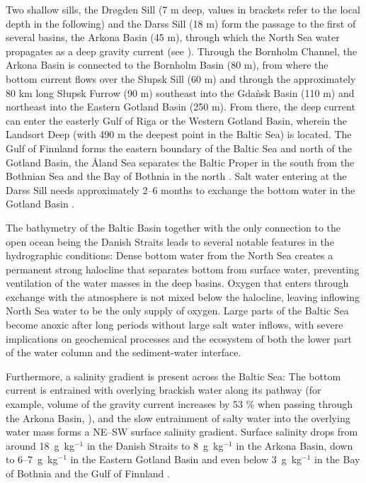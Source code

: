 Two shallow sills, the Dr\o gden Sill (7 m deep, values in brackets refer to the 
local depth in the following) and the Darss Sill (18 m) form the passage to the 
first of several basins, the Arkona Basin (45 m), 
through which the North Sea water propagates as a deep gravity current 
(see ). Through 
the Bornholm Channel, the Arkona Basin is connected to the Bornholm Basin (80 
m), from where the bottom current flows over the S\l upsk Sill (60 m) and 
through the approximately 80 km long S\l upsk Furrow (90 m) southeast into the 
Gda\`{n}sk Basin (110 m) and northeast into the Eastern Gotland Basin (250 m). 
From there, the deep current can enter the easterly Gulf of Riga or the Western 
Gotland Basin, wherein the Landsort Deep (with 490 m the deepest point in the 
Baltic Sea) is located. The Gulf of Finnland forms the eastern boundary of the 
Baltic Sea and north of the Gotland Basin, the \r{A}land Sea separates the 
Baltic Proper in the south from the Bothnian Sea and the Bay of Bothnia in the 
north \citep[][]{reissmann2009}. Salt water entering at the Darss Sill needs 
approximately 2--6 months to exchange the bottom water in the Gotland Basin 
\citep[][]{balticsea}.

The bathymetry of the Baltic Basin together with the only connection to the 
open ocean being the Danish Straits leads to several notable features in the 
hydrographic conditions: Dense bottom water from the North Sea 
creates a permanent strong halocline that separates bottom from surface water, 
preventing ventilation of the water masses in the deep basins. Oxygen that 
enters through exchange with the atmosphere is not mixed below the halocline, 
leaving inflowing North Sea water to be the only supply of oxygen. Large parts 
of the Baltic Sea become anoxic after long periods without large salt 
water inflows, with severe implications on geochemical processes and the 
ecosystem of both the lower part of the water column and the sediment-water 
interface. 

Furthermore, a salinity gradient is present across the Baltic Sea: The bottom 
current is entrained with overlying brackish water along its pathway (for 
example, volume of the gravity current increases by 53 \% when passing through 
the Arkona Basin, \citep[see][]{reissmann2009}), and the slow entrainment of 
salty water into the overlying water mass forms a NE--SW surface salinity 
gradient. Surface salinity drops from around 18~g~kg$^{-1}$ in the Danish 
Straits to 8~g~kg$^{-1}$ in the Arkona Basin, down to 6--7~g~kg$^{-1}$ in the 
Eastern Gotland Basin and even below 3~g~kg$^{-1}$ in the Bay of Bothnia and the 
Gulf of Finnland \citep[][]{balticsea}.

